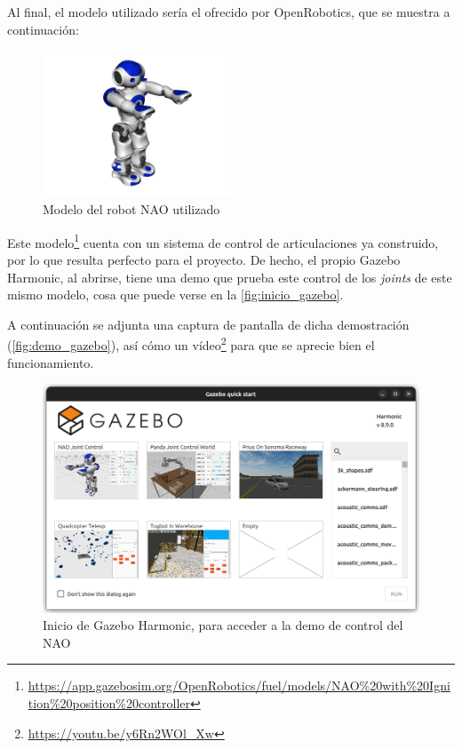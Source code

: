 Al final, el modelo utilizado sería el ofrecido por OpenRobotics, que se muestra a continuación:

\begin{figure}[H]
    \centering
    \includegraphics[width=0.5\textwidth]{figures/cap_3/modelo_original.png}
    \caption{Modelo del robot NAO utilizado}
    \label{fig:modelo_original}
\end{figure}

Este modelo\footnote{\url{https://app.gazebosim.org/OpenRobotics/fuel/models/NAO\%20with\%20Ignition\%20position\%20controller}} cuenta con un sistema de control de articulaciones ya construido, por lo que resulta perfecto para el proyecto. De hecho, el propio Gazebo Harmonic, al abrirse, tiene una demo que prueba este control de los \textit{joints} de este mismo modelo, cosa que puede verse en la \autoref{fig:inicio_gazebo}.

 A continuación se adjunta una captura de pantalla de dicha demostración (\autoref{fig:demo_gazebo}), así cómo un vídeo\footnote{\url{https://youtu.be/y6Rn2WOl_Xw}} para que se aprecie bien el funcionamiento.

\begin{figure}[H]
    \centering
    \includegraphics[width=1\textwidth]{figures/cap_3/inicio_gazebo.png}
    \caption{Inicio de Gazebo Harmonic, para acceder a la demo de control del NAO}
    \label{fig:inicio_gazebo}
\end{figure}

